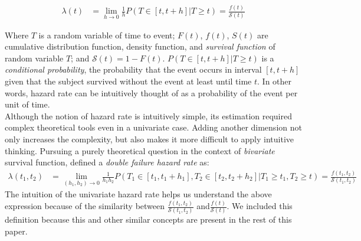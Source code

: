 \documentclass[]{article}
\begin{document}
$$
\begin{aligned}
	\lambda(t) &= \lim_{h\rightarrow 0} \frac{1}{h} P(T\in[t,t+h] | T\geq t)=
	             \frac{f(t)}{\mathcal{S}(t)}
\end{aligned}
$$

Where $T$ is a random variable of time to event; $F(t)$, $f(t)$, $S(t)$ are cumulative distribution function, density function, and \emph{survival function} of random variable $T$; and $\mathcal{S}(t) = 1-F(t)$. $P(T\in[t,t+h] | T\geq t)$ is a \emph{conditional probability}, the probability that the event occurs in interval $[t,t+h]$ given that the subject survived without the event at least until time $t$. In other words, hazard rate can be intuitively thought of as a probability of the event per unit of time.\\
Although the notion of hazard rate is intuitively simple, its estimation required complex theoretical tools even in a univariate case. Adding another dimension not only increases the complexity, but also makes it more difficult to apply intuitive thinking. Pursuing a purely theoretical question in the context of \emph{bivariate} survival function, \cite{basu1971bivariate} %
defined a \emph{double failure hazard rate} as:
$$
\begin{aligned}
	\lambda(t_1,t_2)&= \lim_{(h_1,h_2)\rightarrow 0} \frac{1}{h_1 h_2} P(T_1\in[t_1,t_1+h_1], T_2\in[t_2,t_2+h_2] | T_1\geq t_1, T_2 \geq t)=
	 \frac{f(t_1,t_2)}{\mathcal{S}(t_1,t_2)}
\end{aligned}
$$
The intuition of the univariate hazard rate helps us understand the above expression because of the similarity between $\frac{f(t_1,t_2)}{\mathcal{S}(t_1,t_2)}$ and$\frac{f(t)}{\mathcal{S}(t)}$. We included this definition because this and other similar concepts are present in the rest of this paper.\\
\end{document}
